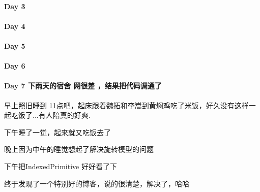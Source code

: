 \documentclass[UTF8,a4paper,8pt]{ctexbook}
\begin{document}
 	 \paragraph{Day 3       \quad     }
 	 \paragraph{Day 4       \quad     }
 	 \paragraph{Day 5       \quad     }
 	 \paragraph{Day 6       \quad     }
 	 \paragraph{Day 7   下雨天的宿舍    \quad   网很差 ，结果把代码调通了   }
	 	 早上照旧睡到 11点吧，起床跟着魏拓和李嵩到黄焖鸡吃了米饭，好久没有这样一起吃饭了...有人陪真的好爽.
	 	 
	 	 下午睡了一觉，起来就又吃饭去了
	 	 
	 	 晚上因为中午的睡觉想起了解决旋转模型的问题
	 	 
	 	 下午把IndexedPrimitive 好好看了下
	 	 
	 	 终于发现了一个特别好的博客，说的很清楚，解决了，哈哈
	 	 
\end{document}
